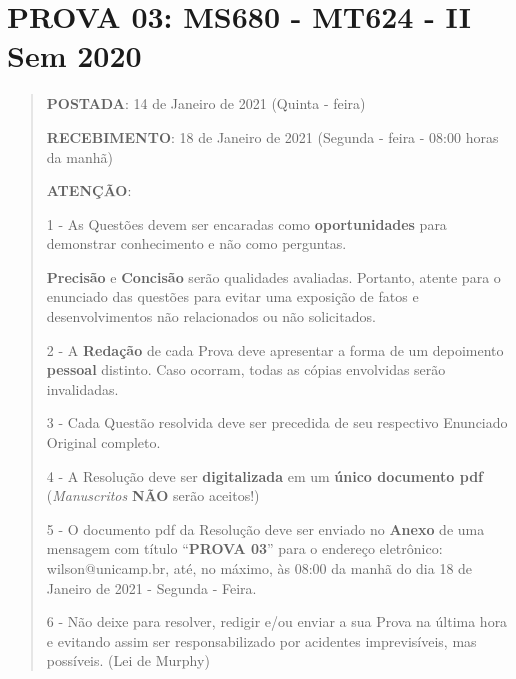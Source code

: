 
\chapter*{PROVA 03: MS680 - MT624 -  II Sem 2020}

\begin{quote}
\textbf{POSTADA}: 14 de Janeiro de 2021 (Quinta - feira)

\textbf{RECEBIMENTO}: 18 de Janeiro de 2021 (Segunda - feira  -  08:00 horas da manhã)

\textbf{ATENÇÃO}:

\begin{description}
\item 1  -  As Questões devem ser encaradas como \textbf{oportunidades} para demonstrar conhecimento e não como perguntas.

\textbf{Precisão} e \textbf{Concisão} serão qualidades avaliadas. Portanto, atente para o enunciado das questões para evitar uma exposição de fatos e desenvolvimentos não relacionados ou não solicitados.

\item 2  -  A \textbf{Redação} de cada Prova deve apresentar a forma de um depoimento \textbf{pessoal} distinto. Caso ocorram, todas as cópias envolvidas serão invalidadas.

\item 3  -  Cada Questão resolvida deve ser precedida de seu respectivo Enunciado Original completo.

\item 4  -  A Resolução deve ser \textbf{digitalizada} em um \textbf{único documento pdf} (\textit{Manuscritos} \textbf{NÃO} serão aceitos!)

\item 5  -  O documento pdf da Resolução deve ser enviado no \textbf{Anexo} de uma mensagem com título ``\textbf{PROVA 03}'' para o endereço eletrônico: wilson@unicamp.br, até, no máximo, às 08:00 da manhã do dia 18 de Janeiro de 2021  -  Segunda - Feira.

\item 6  -  Não deixe para resolver, redigir e/ou enviar a sua Prova na última hora e evitando assim ser responsabilizado por acidentes imprevisíveis, mas possíveis. (Lei de Murphy)
\end{description}
\end{quote}



\clearpage
